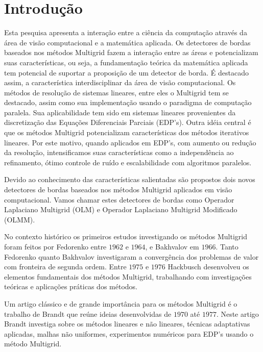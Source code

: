 \documentclass[a4paper]{article} %
\begin{document}
\section{Introdução}
Esta pesquisa apresenta a interação entre a ciência da computação através da área de visão computacional e a matemática aplicada. Os detectores de bordas baseados nos métodos Multigrid fazem a interação entre as áreas e potencializam suas características, ou seja, a fundamentação teórica da matemática aplicada tem potencial de suportar a proposição de um detector de borda. É destacado assim, a característica interdisciplinar da área de visão computacional.     
Os métodos  de resolução de sistemas lineares, entre eles o Multigrid tem se destacado, assim como sua implementação usando o paradigma de computação paralela. Sua  aplicabilidade  tem  sido em  sistemas lineares  provenientes  da discretização das Equações Diferenciais Parciais (EDP's). Outra idéia central é que os métodos Multigrid potencializam características dos métodos iterativos lineares. Por este motivo, quando aplicados em EDP's, com aumento ou redução da resolução, intensificamos suas características como a independência ao refinamento, ótimo controle de ruído e escalabilidade com algoritmos paralelos.

Devido ao conhecimento das características salientadas são propostos dois novos detectores de bordas baseados nos métodos Multigrid aplicados em visão computacional. Vamos chamar estes detectores de bordas como Operador Laplaciano Multigrid (OLM) e Operador Laplaciano Multigrid Modificado (OLMM).


No contexto histórico os primeiros  estudos  investigando  os  métodos Multigrid  foram  feitos  por Fedorenko \cite{Fedorenko1962relaxation,Fedorenko1964speed} entre $1962$ e $1964$, e Bakhvalov \cite{Bakhvalov} em $1966$. Tanto Fedorenko quanto Bakhvalov investigaram a  convergência dos problemas de valor com fronteira de segunda ordem. Entre  $1975$ e $1976$ Hackbusch \cite{Hackbusch1980convergence} desenvolveu os  elementos fundamentais  dos métodos Multigrid,  trabalhando com  investigações  teóricas  e aplicações práticas dos métodos.

Um artigo clássico e de grande importância para os métodos Multigrid é o trabalho de Brandt \cite{brandt1977multi}  que reúne ideias desenvolvidas de $1970$  até $1977$. Neste  artigo Brandt investiga  sobre  os métodos  lineares e não lineares,  técnicas adaptativas  aplicadas, malhas não uniformes, experimentos numéricos para EDP's usando o método Multigrid.
\end{document}
